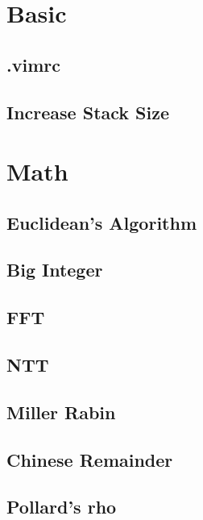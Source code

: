 \documentclass[a4paper,10pt,twocolumn,oneside]{article}
\begin{document}
\pagestyle{fancy}
\fancyfoot{}
\fancyhead[R]{\thepage}
\renewcommand{\headrulewidth}{0.4pt}
\renewcommand{\contentsname}{Contents}

\scriptsize
\tableofcontents


\section{Basic}
\subsection{.vimrc}

\subsection{Increase Stack Size}


\section{Math}
\subsection{Euclidean's Algorithm}

\subsection{Big Integer}

\subsection{FFT}

\subsection{NTT}

\subsection{Miller Rabin}

\subsection{Chinese Remainder}

\subsection{Pollard's rho}

\end{document}
